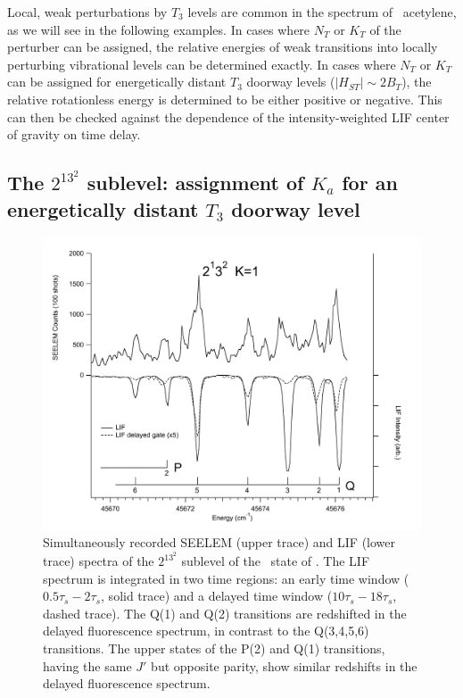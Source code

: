 \documentclass[12pt]{mitthesis}
\begin{document}
Local, weak perturbations by $T_3$ levels are common in the spectrum
of \astate\ acetylene, as we will see in the following examples.  In
cases where $N_T$ or $K_T$ of the perturber can be assigned, the
relative energies of weak transitions into locally perturbing
vibrational levels can be determined exactly.  In cases where $N_T$ or
$K_T$ can be assigned for energetically distant $T_3$ doorway levels
($\lvert H_{ST} \rvert \sim 2B_T$), the relative rotationless energy
is determined to be either positive or negative.  This can then be
checked against the dependence of the intensity-weighted LIF center of
gravity on time delay.

\subsection{The $2^13^2$  sublevel: assignment of $K_a$ for an
  energetically distant $T_3$ doorway level}



\begin{figure}
  \caption{Simultaneously recorded SEELEM (upper trace) and LIF (lower
    trace) spectra of the $2^13^2$  sublevel of the \astate\
    state of .  The LIF spectrum is integrated in two time
    regions: an early time window ($0.5\tau_s-2\tau_s$, solid trace)
    and a delayed time window ($10\tau_s-18\tau_s$, dashed trace).
    The Q(1) and Q(2) transitions are redshifted in the delayed
    fluorescence spectrum, in contrast to the Q(3,4,5,6) transitions.
    The upper states of the P(2) and Q(1) transitions, having the same
    $J'$ but opposite parity, show similar redshifts in the delayed
    fluorescence spectrum.}
  \label{fig:spectrum-2132}
  \centering
  \vspace{1cm}
  \includegraphics[width=7in,angle=90]{spectrum-2132-q6q1.pdf}
\end{figure}
\end{document}

